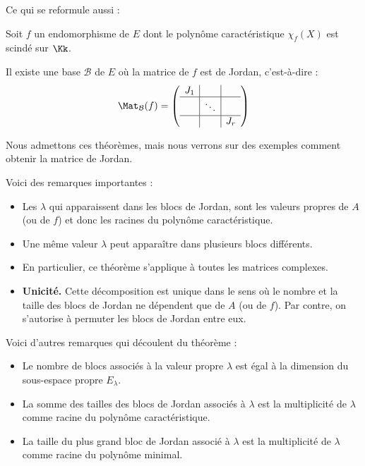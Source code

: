 \documentclass[12pt, class=report,crop=false]{standalone}
\begin{document}
Ce qui se reformule aussi :
\begin{theoreme}
Soit $f$ un endomorphisme de $E$ dont le polynôme caractéristique $\chi_f(X)$ est scindé sur $\Kk$.

Il existe une base $\mathcal{B}$ de $E$ où la matrice de $f$ est de Jordan, c'est-à-dire  :
\[ \Mat_{\mathcal{B}} (f) = 
\left(\begin{array}{c|c|c}
J_1&&\\\hline
&\ddots&\\\hline
&&J_r
\end{array}\right)\]
\end{theoreme}

Nous admettons ces théorèmes, mais nous verrons sur des exemples comment obtenir la matrice de Jordan.

\bigskip


Voici des remarques importantes :
\begin{itemize}
  \item Les $\lambda$ qui apparaissent dans les blocs de Jordan, sont les valeurs propres de $A$ (ou de $f$) et donc les 
racines du polynôme caractéristique.

  \item Une même valeur $\lambda$ peut apparaître dans plusieurs
  blocs différents.
    
  \item En particulier, ce théorème s'applique à toutes les matrices complexes.  
  
  \item \textbf{Unicité.} Cette décomposition est unique dans le sens où le nombre et la taille des blocs de Jordan ne dépendent que de $A$ (ou de $f$). Par contre, on s'autorise à permuter les blocs de Jordan entre eux.

\end{itemize}

\bigskip

Voici d'autres remarques qui découlent du théorème :
\begin{itemize}
  \item Le nombre de blocs associés à la valeur propre $\lambda$ est égal à
  la dimension du sous-espace propre $E_\lambda$.
    
  \item La somme des tailles des blocs de Jordan associés à $\lambda$
  est la multiplicité de $\lambda$ comme racine du polynôme caractéristique.
  
  \item La taille du plus grand bloc de Jordan associé à $\lambda$ est la multiplicité de $\lambda$ comme racine du polynôme minimal.
\end{itemize}
\end{document}
